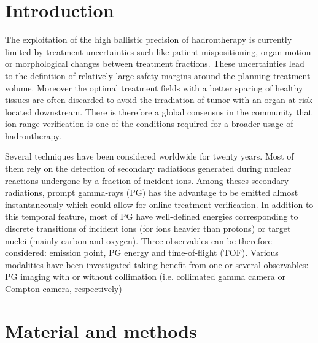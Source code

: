 \documentclass[11pt]{iopart}
\begin{document}
\tableofcontents

\newpage

\section{Introduction}

The exploitation of the high ballistic precision of hadrontherapy is currently limited by treatment uncertainties such like patient mispositioning, organ motion or morphological  changes between treatment fractions. These uncertainties lead to the definition of relatively large safety margins around the planning treatment volume. Moreover the optimal treatment fields with a better sparing of healthy tissues are often discarded to avoid the irradiation of tumor with an organ at risk located downstream. There is therefore a global consensus in the community that ion-range verification is one of the conditions required for a broader usage of hadrontherapy. 

Several techniques have been considered worldwide for twenty years. Most of them rely on the detection of secondary radiations generated during nuclear reactions undergone by a fraction of incident ions. Among theses secondary radiations, prompt gamma-rays (PG) has the advantage to be emitted almost instantaneously which could allow for online treatment verification. In addition to this temporal feature, most of PG have well-defined energies corresponding to discrete transitions of incident ions (for ions heavier than protons) or target nuclei (mainly carbon and oxygen). Three observables can be therefore considered: emission point, PG energy and time-of-flight (TOF). Various modalities have been investigated taking benefit from one or several observables: PG imaging with or without collimation (i.e. collimated gamma camera or Compton camera, respectively)




\section{Material and methods}
\end{document}
